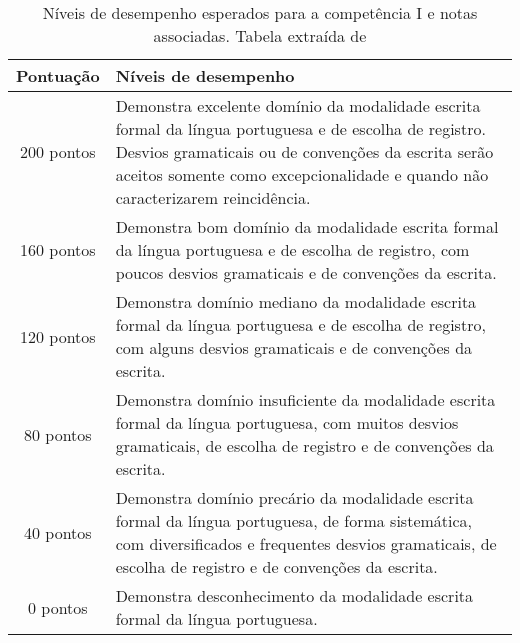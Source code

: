 \begin{table}[H]
    \centering
    \caption{Níveis de desempenho esperados para a competência I e notas associadas. Tabela extraída de \cite[p.~10]{cartilha-redacao}}
    \label{tab:competencia-1}
    \begin{tabularx}{\textwidth}{|c|X|}
        \hline
        \textbf{Pontuação} & \textbf{Níveis de desempenho} \\
        \hline
        200 pontos & Demonstra excelente domínio da modalidade escrita formal da língua portuguesa e de escolha de registro. Desvios gramaticais ou de convenções da escrita serão aceitos somente como excepcionalidade e quando não caracterizarem reincidência. \\
        \hline
        160 pontos & Demonstra bom domínio da modalidade escrita formal da língua portuguesa e de escolha de registro, com poucos desvios gramaticais e de convenções da escrita. \\
        \hline
        120 pontos & Demonstra domínio mediano da modalidade escrita formal da língua portuguesa e de escolha de registro, com alguns desvios gramaticais e de convenções da escrita. \\
        \hline
        80 pontos & Demonstra domínio insuficiente da modalidade escrita formal da língua portuguesa, com muitos desvios gramaticais, de escolha de registro e de convenções da escrita. \\
        \hline
        40 pontos & Demonstra domínio precário da modalidade escrita formal da língua portuguesa, de forma sistemática, com diversificados e frequentes desvios gramaticais, de escolha de registro e de convenções da escrita. \\
        \hline
        0 pontos & Demonstra desconhecimento da modalidade escrita formal da língua portuguesa. \\
        \hline
    \end{tabularx}
\end{table}




